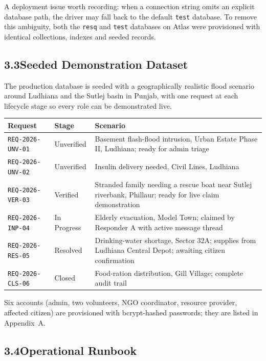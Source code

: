 \documentclass[11pt,a4paper]{article}
\newcommand{\tc}[1]{\texttt{\small #1}}
\begin{document}
A deployment issue worth recording: when a connection string omits an explicit database path, the driver may fall back to the default \tc{test} database. To remove this ambiguity, both the \tc{resq} and \tc{test} databases on Atlas were provisioned with identical collections, indexes and seeded records.

\subsection{3.3\quad Seeded Demonstration Dataset}\label{s33}

The production database is seeded with a geographically realistic flood scenario around Ludhiana and the Sutlej basin in Punjab, with one request at each lifecycle stage so every role can be demonstrated live.

\renewcommand{\arraystretch}{1.2}
\begin{tabularx}{\textwidth}{@{}p{1.35in}p{0.85in}X@{}}
\toprule
\textbf{Request} & \textbf{Stage} & \textbf{Scenario}\\
\midrule
\tc{REQ-2026-UNV-01} & Unverified & Basement flash-flood intrusion, Urban Estate Phase II, Ludhiana; ready for admin triage\\
\tc{REQ-2026-UNV-02} & Unverified & Insulin delivery needed, Civil Lines, Ludhiana\\
\tc{REQ-2026-VER-03} & Verified & Stranded family needing a rescue boat near Sutlej riverbank, Phillaur; ready for live claim demonstration\\
\tc{REQ-2026-INP-04} & In Progress & Elderly evacuation, Model Town; claimed by Responder A with active message thread\\
\tc{REQ-2026-RES-05} & Resolved & Drinking-water shortage, Sector 32A; supplies from Ludhiana Central Depot; awaiting citizen confirmation\\
\tc{REQ-2026-CLS-06} & Closed & Food-ration distribution, Gill Village; complete audit trail\\
\bottomrule
\end{tabularx}
\renewcommand{\arraystretch}{1}

Six accounts (admin, two volunteers, NGO coordinator, resource provider, affected citizen) are provisioned with bcrypt-hashed passwords; they are listed in Appendix~A.

\subsection{3.4\quad Operational Runbook}\label{s34}
\end{document}
